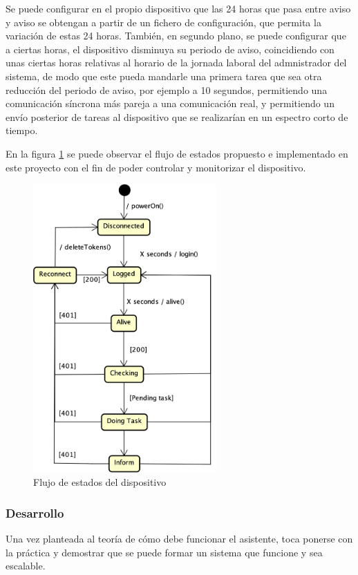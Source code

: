         Se puede configurar en el propio dispositivo que las 24 horas que pasa entre aviso y aviso se obtengan a partir de un fichero de configuración, que permita la variación de estas 24 horas.
        También, en segundo plano, se puede configurar que a ciertas horas, el dispositivo disminuya su periodo de aviso, coincidiendo con unas ciertas horas relativas al horario de la jornada laboral del admnistrador del sistema, de modo que este pueda mandarle una primera tarea que sea otra reducción del periodo de aviso, por ejemplo a 10 segundos, permitiendo una comunicación síncrona más pareja a una comunicación real, y permitiendo un envío posterior de tareas al dispositivo que se realizarían en un espectro corto de tiempo.
        
        En la figura \ref{fig:prototype-flow} se puede observar el flujo de estados propuesto e implementado en este proyecto con el fin de poder controlar y monitorizar el dispositivo.
        
        \begin{figure}[h!]
            \centering
            \includegraphics[width=7cm]{./img/state/prototype-flow.png}
            \caption{Flujo de estados del dispositivo}
            \label{fig:prototype-flow}
        \end{figure}
    
    \subsubsection{Desarrollo}
        Una vez planteada al teoría de cómo debe funcionar el asistente, toca ponerse con la práctica y demostrar que se puede formar un sistema que funcione y sea escalable.
        
